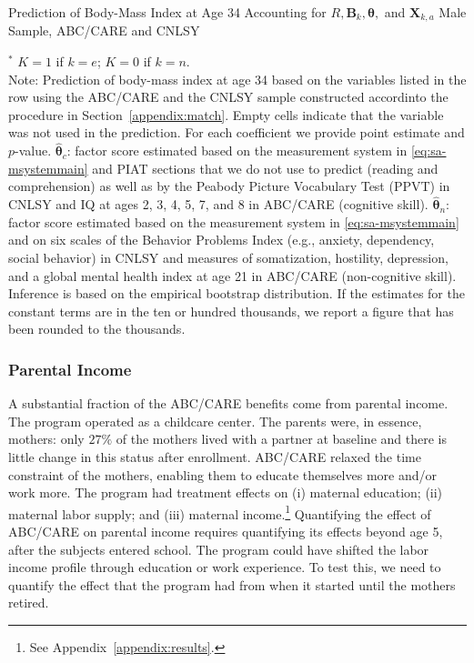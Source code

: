 \begin{table}
\begin{threeparttable}
\caption{Prediction of Body-Mass Index at Age 34 Accounting for $R, \bm{B}_k, \bm{\theta},$ and $\bm{X}_{k,a}$ Male Sample, ABC/CARE and CNLSY}
\label{table:invfin}
\centering
\scriptsize

\begin{tablenotes}
\footnotesize
\item $^\ast$ $K=1$ if $k=e$; $K=0$ if $k=n$.\\ 
Note: Prediction of body-mass index at age 34 based on the variables listed in the row using the ABC/CARE and the CNLSY sample constructed accordinto the procedure in Section~\ref{appendix:match}. Empty cells indicate that the variable was not used in the prediction. For each coefficient we provide point estimate and $p$-value. $\hat{\bm{\theta}}_{c}$: factor score estimated based on the measurement system in \eqref{eq:sa-msystemmain} and PIAT sections that we do not use to predict (reading and comprehension) as well as by the Peabody Picture Vocabulary Test (PPVT) in CNLSY and IQ at ages 2, 3, 4, 5, 7, and 8 in ABC/CARE (cognitive skill). $\hat{\bm{\theta}}_{n}$: factor score estimated based on the measurement system in \eqref{eq:sa-msystemmain} and on six scales of the Behavior Problems Index (e.g., anxiety, dependency, social behavior) in CNLSY and measures of somatization, hostility, depression, and a global mental health index at age 21 in ABC/CARE (non-cognitive skill). Inference is based on the empirical bootstrap distribution. If the estimates for the constant terms are in the ten or hundred thousands, we report a figure that has been rounded to the thousands.
\end{tablenotes}
\end{threeparttable}
\end{table}

\subsubsection{Parental Income}\label{app:parentalincome}

\noindent A substantial fraction of the ABC/CARE benefits come from parental income. The program operated as a childcare center. The parents were, in essence,  mothers: only $27\%$ of the mothers lived with a partner at baseline and there is little change in this status after enrollment. ABC/CARE relaxed the time constraint of the mothers, enabling them to educate themselves more and/or work more. The program had treatment effects on (i) maternal education; (ii) maternal labor supply; and (iii) maternal income.\footnote{See Appendix~\ref{appendix:results}.} Quantifying the effect of ABC/CARE on parental income requires quantifying its effects beyond age 5, after the subjects entered school. The program could have shifted the labor income profile through education or work experience. To test this, we need to quantify the effect that the program had from when it started until the mothers retired.\\

